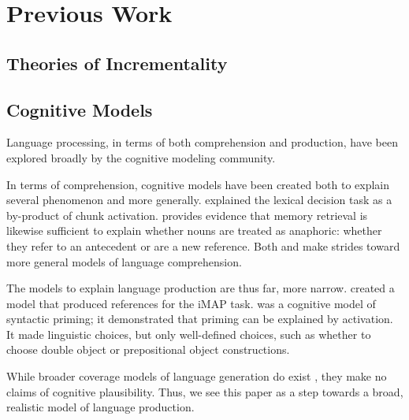 \section{Previous Work}
\subsection{Theories of Incrementality}


\subsection{Cognitive Models}
Language processing, in terms of both comprehension and production, have been explored broadly by the cognitive modeling community.

In terms of comprehension, cognitive models have been created both to explain several phenomenon and more generally. \citet{decision} explained the lexical decision task as a by-product of chunk activation. \citet{anaphoric} provides evidence that memory retrieval is likewise sufficient to explain whether nouns are treated as anaphoric: whether they refer to an antecedent or are a new reference. Both \citet{comp-model} and \citet{big-comprehension} make strides toward more general models of language comprehension.

The models to explain language production are thus far, more narrow. \citet{references} created a model that produced references for the iMAP task. \citet{model-priming} was a cognitive model of syntactic priming; it demonstrated that priming can be explained by activation. It made linguistic choices, but only well-defined choices, such as whether to choose double object or prepositional object constructions. 

While broader coverage models of language generation do exist \citep{chart}, they make no claims of cognitive plausibility. Thus, we see this paper as a step towards a broad, realistic model of language production. 